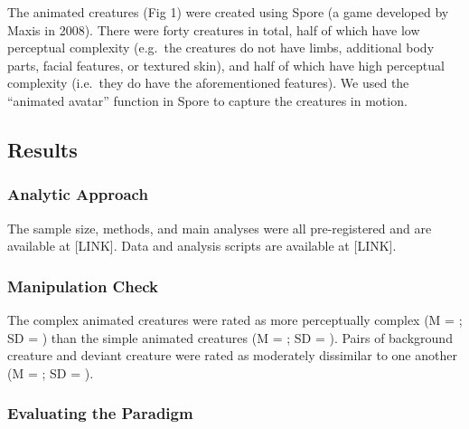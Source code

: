 \documentclass[10pt, letterpaper]{article}
\begin{document}
The animated creatures (Fig 1) were created using Spore (a game developed by Maxis in 2008). There were forty creatures in total, half of which have low perceptual complexity (e.g.~the creatures do not have limbs, additional body parts, facial features, or textured skin), and half of which have high perceptual complexity (i.e.~they do have the aforementioned features). We used the ``animated avatar'' function in Spore to capture the creatures in motion.

\hypertarget{results}{%
\subsection{Results}\label{results}}

\hypertarget{analytic-approach}{%
\subsubsection{Analytic Approach}\label{analytic-approach}}

The sample size, methods, and main analyses were all pre-registered and are available at {[}LINK{]}. Data and analysis scripts are available at {[}LINK{]}.

\hypertarget{manipulation-check}{%
\subsubsection{Manipulation Check}\label{manipulation-check}}

The complex animated creatures were rated as more perceptually complex (M = ; SD = ) than the simple animated creatures (M = ; SD = ). Pairs of background creature and deviant creature were rated as moderately dissimilar to one another (M = ; SD = ).

\hypertarget{evaluating-the-paradigm}{%
\subsubsection{Evaluating the Paradigm}\label{evaluating-the-paradigm}}
\end{document}
